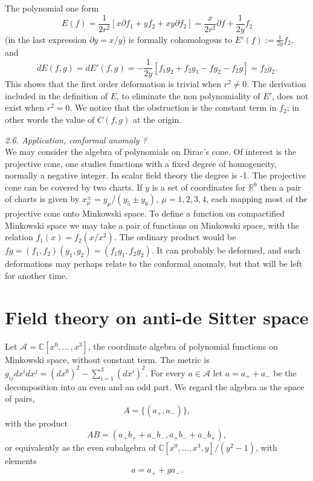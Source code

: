 \documentclass[a4paper,a4paper]{article}
\begin{document}
The polynomial one form
$$
E(f) = \frac{1}{2r^2}[x\partial f_1 + yf_2 + xy\partial f_2]  =
\frac{x}{2r^2}\partial f + \frac{1}{2y}f_2 
$$ 
(in the last expression $\partial y = x/y$) is formally cohomologous to
$E'(f) := \frac{1}{2y}f_2$, and
$$
dE(f,g) = dE'(f,g) = -\frac{1}{2y}[f_1g_2 + f_2g_1 - fg_2 - f_2g]
= f_2g_2.
$$  
This   shows that the first order deformation is trivial when $r^2 \neq 0$. 
The derivation included in the definition of $E$, to eliminate the
non polynomiality of $E'$, does not exist when $r^2 = 0$.  We notice
that the obstruction is the constant term in $f_2$; in other words the
value of $C(f,g)$ at the origin.
 
\smallskip

\noindent\textit{2.6. Application, conformal anomaly ?} \\
We may consider the algebra of polynomials on Dirac's cone.  Of interest is 
the projective cone, one studies functions with a fixed degree of 
homogeneity, normally a negative integer. In scalar field theory the degree
is -1.  The projective cone can be covered by two charts. If $y$ is a set 
of coordinates for $\mathbb{R}^6$ then a pair of  charts is given by 
$x^\pm_\mu = y_\mu/(y_5\pm y_6), ~\mu = 1,2,3,4$,
each mapping most of the projective cone onto Minkowski space. To define a
function on compactified Minkowski space we may take a pair of functions on
Minkowski space, with the relation $f_1(x) = f_2({x}/{x^2})$.
The ordinary product would be $fg= (f_1,f_2)(g_1,g_2) = (f_1g_1,f_2g_2)$.
It can probably be deformed, and such deformations may perhaps relate to the
conformal anomaly, but that will be left for another time.

\section{Field theory on  anti-de Sitter space}  %

Let ${\mathcal{A}} = \mathbb{C}[x^0,... \,,x^3]$, the coordinate algebra of 
polynomial functions on %
Minkowski space, without constant term. The metric 
is $g_{ij}dx^idx^j = (dx^0)^2 - \sum_{i = 1}^3(dx^i)^2$.
For every $a\in {\mathcal{A}}$ let $ a = a_+ + a_-$ be the decomposition into
an even and an odd part. We regard the algebra as the space of pairs,
$$
A = \{(a_+,a_-)\},
$$ with the product
$$
AB = (a_+b_+ + a_-b_-, a_+b_- + a_-b_+),
$$
or equivalently as the even subalgebra of  
$\mathbb{C}[x^0, \ldots,x^3,y]/(y^2-1)$, with elements
$$
a = a_+ + ya_-.
$$
\end{document}
